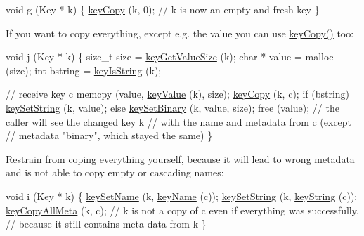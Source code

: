 \begin{DoxyCodeInclude}
\textcolor{keywordtype}{void} g (Key * k)
\{
        \hyperlink{group__key_ga6a12cbbe656a1ad9f41b8c681d7a2f92}{keyCopy} (k, 0);
        \textcolor{comment}{// k is now an empty and fresh key}
\}
\end{DoxyCodeInclude}
 If you want to copy everything, except e.\+g. the value you can use \hyperlink{group__key_ga6a12cbbe656a1ad9f41b8c681d7a2f92}{key\+Copy()} too\+:


\begin{DoxyCodeInclude}
\textcolor{keywordtype}{void} j (Key * k)
\{
        \textcolor{keywordtype}{size\_t} size = \hyperlink{group__keyvalue_gae326672fffb7474abfe9baf53b73217e}{keyGetValueSize} (k);
        \textcolor{keywordtype}{char} * value = malloc (size);
        \textcolor{keywordtype}{int} bstring = \hyperlink{group__keytest_gaea7670778abd07fee0fe8ac12a149190}{keyIsString} (k);

        \textcolor{comment}{// receive key c}
        memcpy (value, \hyperlink{group__keyvalue_ga6f29609c5da53c6dc26a98678d5752af}{keyValue} (k), size);
        \hyperlink{group__key_ga6a12cbbe656a1ad9f41b8c681d7a2f92}{keyCopy} (k, c);
        \textcolor{keywordflow}{if} (bstring)
                \hyperlink{group__keyvalue_ga622bde1eb0e0c4994728331326340ef2}{keySetString} (k, value);
        \textcolor{keywordflow}{else}
                \hyperlink{group__keyvalue_gaa50a5358fd328d373a45f395fa1b99e7}{keySetBinary} (k, value, size);
        free (value);
        \textcolor{comment}{// the caller will see the changed key k}
        \textcolor{comment}{// with the name and metadata from c (except}
        \textcolor{comment}{// metadata "binary", which stayed the same)}
\}
\end{DoxyCodeInclude}
 Restrain from coping everything yourself, because it will lead to wrong metadata and is not able to copy empty or cascading names\+:


\begin{DoxyCodeInclude}
\textcolor{keywordtype}{void} i (Key * k)
\{
        \hyperlink{group__keyname_ga7699091610e7f3f43d2949514a4b35d9}{keySetName} (k, \hyperlink{group__keyname_ga8e805c726a60da921d3736cda7813513}{keyName} (c));
        \hyperlink{group__keyvalue_ga622bde1eb0e0c4994728331326340ef2}{keySetString} (k, \hyperlink{group__keyvalue_ga880936f2481d28e6e2acbe7486a21d05}{keyString} (c));
        \hyperlink{group__keymeta_ga8e63720a65610a29597494d0671f9401}{keyCopyAllMeta} (k, c);
        \textcolor{comment}{// k is not a copy of c even if everything was successfully,}
        \textcolor{comment}{// because it still contains meta data from k}
\}
\end{DoxyCodeInclude}



